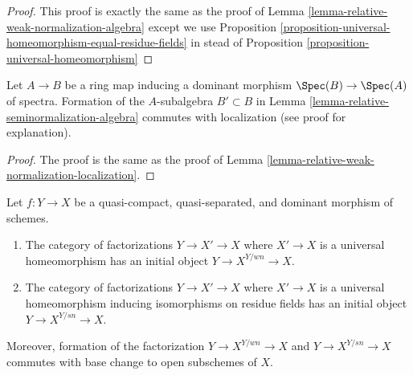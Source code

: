 \begin{proof}
This proof is exactly the same as the proof of
Lemma \ref{lemma-relative-weak-normalization-algebra} except we use
Proposition \ref{proposition-universal-homeomorphism-equal-residue-fields}
in stead of Proposition \ref{proposition-universal-homeomorphism}
\end{proof}

\begin{lemma}
\label{lemma-relative-seminormalization-localization}
Let $A \to B$ be a ring map inducing a dominant morphism
$\Spec(B) \to \Spec(A)$ of spectra. Formation of the $A$-subalgebra
$B' \subset B$ in Lemma \ref{lemma-relative-seminormalization-algebra}
commutes with localization (see proof for explanation).
\end{lemma}

\begin{proof}
The proof is the same as the proof of
Lemma \ref{lemma-relative-weak-normalization-localization}.
\end{proof}

\begin{lemma}
\label{lemma-relative-seminormalization}
Let $f : Y \to X$ be a quasi-compact, quasi-separated, and dominant
morphism of schemes.
\begin{enumerate}
\item The category of factorizations $Y \to X' \to X$ where $X' \to X$
is a universal homeomorphism has an initial object $Y \to X^{Y/wn} \to X$.
\item The category of factorizations $Y \to X' \to X$ where $X' \to X$
is a universal homeomorphism inducing isomorphisms on residue fields
has an initial object $Y \to X^{Y/sn} \to X$.
\end{enumerate}
Moreover, formation of the factorization $Y \to X^{Y/wn} \to X$ and
$Y \to X^{Y/sn} \to X$ commutes with base change to open subschemes of $X$.
\end{lemma}

